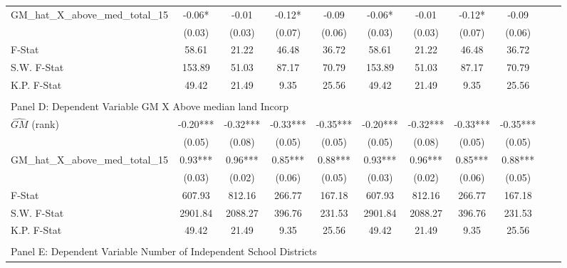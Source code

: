 \begin{table}[htbp]
\begin{threeparttable}
\begin{tabular}{l*{10}{c}}
\addlinespace
GM\_hat\_X\_above\_med\_total\_15&      -0.06*  &      -0.01   &      -0.12*  &      -0.09   &      -0.06*  &      -0.01   &      -0.12*  &      -0.09   \\
                &     (0.03)   &     (0.03)   &     (0.07)   &     (0.06)   &     (0.03)   &     (0.03)   &     (0.07)   &     (0.06)   \\
\midrule
F-Stat          &      58.61   &      21.22   &      46.48   &      36.72   &      58.61   &      21.22   &      46.48   &      36.72   \\
S.W. F-Stat     &     153.89   &      51.03   &      87.17   &      70.79   &     153.89   &      51.03   &      87.17   &      70.79   \\
K.P. F-Stat     &      49.42   &      21.49   &       9.35   &      25.56   &      49.42   &      21.49   &       9.35   &      25.56   \\
\cmidrule[\heavyrulewidth](lr){1-9} \\ \cmidrule[\heavyrulewidth](lr){1-9}
\multicolumn{8}{l}{Panel D: Dependent Variable GM X Above median land Incorp}\\
\cmidrule(lr){1-9}
$\hat{GM}$ (rank)&      -0.20***&      -0.32***&      -0.33***&      -0.35***&      -0.20***&      -0.32***&      -0.33***&      -0.35***\\
                &     (0.05)   &     (0.08)   &     (0.05)   &     (0.05)   &     (0.05)   &     (0.08)   &     (0.05)   &     (0.05)   \\
\addlinespace
GM\_hat\_X\_above\_med\_total\_15&       0.93***&       0.96***&       0.85***&       0.88***&       0.93***&       0.96***&       0.85***&       0.88***\\
                &     (0.03)   &     (0.02)   &     (0.06)   &     (0.05)   &     (0.03)   &     (0.02)   &     (0.06)   &     (0.05)   \\
\midrule
F-Stat          &     607.93   &     812.16   &     266.77   &     167.18   &     607.93   &     812.16   &     266.77   &     167.18   \\
S.W. F-Stat     &    2901.84   &    2088.27   &     396.76   &     231.53   &    2901.84   &    2088.27   &     396.76   &     231.53   \\
K.P. F-Stat     &      49.42   &      21.49   &       9.35   &      25.56   &      49.42   &      21.49   &       9.35   &      25.56   \\
\cmidrule[\heavyrulewidth](lr){1-9} \\ \cmidrule[\heavyrulewidth](lr){1-9}
\multicolumn{8}{l}{Panel E: Dependent Variable Number of Independent School Districts}\\

\end{tabular}
\end{threeparttable}
\end{table}
